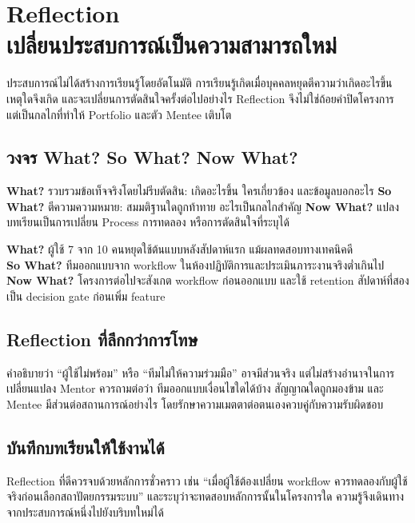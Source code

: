 \chapter{Reflection\\เปลี่ยนประสบการณ์เป็นความสามารถใหม่}

ประสบการณ์ไม่ได้สร้างการเรียนรู้โดยอัตโนมัติ การเรียนรู้เกิดเมื่อบุคคลหยุดตีความว่าเกิดอะไรขึ้น เหตุใดจึงเกิด และจะเปลี่ยนการตัดสินใจครั้งต่อไปอย่างไร Reflection จึงไม่ใช่ถ้อยคำปิดโครงการ แต่เป็นกลไกที่ทำให้ Portfolio และตัว Mentee เติบโต


\section{วงจร What? So What? Now What?}
\textbf{What?} รวบรวมข้อเท็จจริงโดยไม่รีบตัดสิน: เกิดอะไรขึ้น ใครเกี่ยวข้อง และข้อมูลบอกอะไร \textbf{So What?} ตีความความหมาย: สมมติฐานใดถูกท้าทาย อะไรเป็นกลไกสำคัญ \textbf{Now What?} แปลงบทเรียนเป็นการเปลี่ยน Process การทดลอง หรือการตัดสินใจที่ระบุได้

\begin{examplebox}
\textbf{What?} ผู้ใช้ 7 จาก 10 คนหยุดใช้ต้นแบบหลังสัปดาห์แรก แม้ผลทดสอบทางเทคนิคดี\\
\textbf{So What?} ทีมออกแบบจาก workflow ในห้องปฏิบัติการและประเมินภาระงานจริงต่ำเกินไป\\
\textbf{Now What?} โครงการต่อไปจะสังเกต workflow ก่อนออกแบบ และใช้ retention สัปดาห์ที่สองเป็น decision gate ก่อนเพิ่ม feature
\end{examplebox}

\section{Reflection ที่ลึกกว่าการโทษ}
คำอธิบายว่า \enquote{ผู้ใช้ไม่พร้อม} หรือ \enquote{ทีมไม่ให้ความร่วมมือ} อาจมีส่วนจริง แต่ไม่สร้างอำนาจในการเปลี่ยนแปลง Mentor ควรถามต่อว่า ทีมออกแบบเงื่อนไขใดได้บ้าง สัญญาณใดถูกมองข้าม และ Mentee มีส่วนต่อสถานการณ์อย่างไร โดยรักษาความเมตตาต่อตนเองควบคู่กับความรับผิดชอบ

\section{บันทึกบทเรียนให้ใช้งานได้}
Reflection ที่ดีควรจบด้วยหลักการชั่วคราว เช่น \enquote{เมื่อผู้ใช้ต้องเปลี่ยน workflow ควรทดลองกับผู้ใช้จริงก่อนเลือกสถาปัตยกรรมระบบ} และระบุว่าจะทดสอบหลักการนั้นในโครงการใด ความรู้จึงเดินทางจากประสบการณ์หนึ่งไปยังบริบทใหม่ได้

